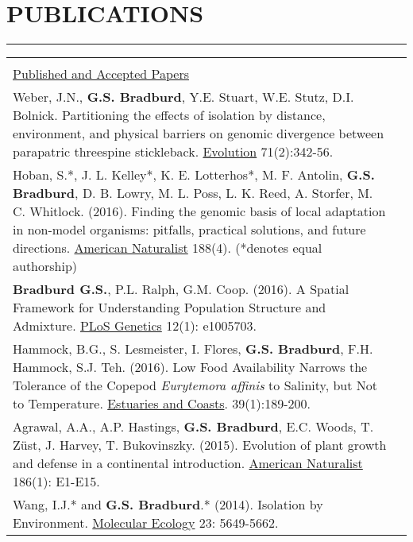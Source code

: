 \documentclass{article}
\begin{document}
\section*{PUBLICATIONS}
\vspace{-0.6cm}
\rule{470pt}{0.4pt}
%
\begin{tabular}{>{\everypar{\hangindent1cm}}p{}p{}}
\hfill\\
%
\vspace{0.2cm}
%
\underline{Published and Accepted Papers} \hfill\\
\vspace{-0.1cm}
Weber, J.N., \textbf{G.S. Bradburd}, Y.E. Stuart, W.E. Stutz, D.I. Bolnick.
Partitioning the effects of isolation by distance, environment, and physical barriers 
on genomic divergence between parapatric threespine stickleback.
\underline{Evolution} 71(2):342-56. \\
%
\vspace{-0.1cm}
Hoban, S.*, J. L. Kelley*, K. E. Lotterhos*, M. F. Antolin, \textbf{G.S. Bradburd}, D. B. Lowry, M. L. Poss, L. K. Reed, A. Storfer, M. C. Whitlock. (2016). Finding the genomic basis of local adaptation in non-model organisms: pitfalls, practical solutions, and future directions. \underline{American Naturalist} 188(4). (*denotes equal authorship)\\
%
\vspace{-0.1cm}
\textbf{Bradburd G.S.}, P.L. Ralph, G.M. Coop. (2016). A Spatial Framework for Understanding Population Structure and Admixture. \underline{PLoS Genetics} 12(1): e1005703.\\
%
\vspace{-0.1cm}
Hammock, B.G., S. Lesmeister, I. Flores, \textbf{G.S. Bradburd}, F.H. Hammock, S.J. Teh. (2016). Low Food Availability Narrows the Tolerance of the Copepod \textit{Eurytemora affinis} to Salinity, but Not to Temperature. \underline{Estuaries and Coasts}.  39(1):189-200.\\
%
\vspace{-0.1cm}
Agrawal, A.A., A.P. Hastings, \textbf{G.S. Bradburd}, E.C. Woods, T. Z{\"u}st, J. Harvey, T. Bukovinszky. (2015).
Evolution of plant growth and defense in a continental introduction. \underline{American Naturalist} 186(1): E1-E15.\\
%
\vspace{-0.1cm}
Wang, I.J.* and \textbf{G.S. Bradburd}.* (2014). Isolation by Environment. \underline{Molecular Ecology} 23: 5649-5662.  & \hfill\\

\end{tabular}
\end{document}

